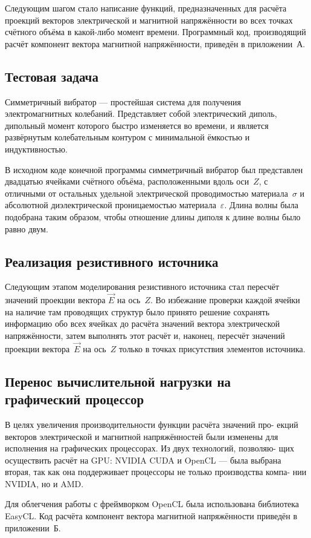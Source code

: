 Следующим шагом стало написание функций, предназначенных для расчёта проекций векторов электрической и магнитной напряжённости во всех точках счётного объёма в какой-либо момент времени. Программный код, производящий расчёт компонент вектора магнитной напряжённости, приведён в приложении~А.

\subsection{Тестовая задача}

Симметричный вибратор --- простейшая система для получения электромагнитных колебаний. Представляет собой электрический диполь, дипольный момент которого быстро изменяется во времени, и является развёрнутым колебательным контуром с минимальной ёмкостью и индуктивностью.

В исходном коде конечной программы симметричный вибратор был представлен двадцатью ячейками счётного объёма, расположенными вдоль оси~$ Z $, с отличными от остальных удельной электрической проводимостью материала~$\sigma$
и абсолютной диэлектрической проницаемостью материала~$\varepsilon$. Длина волны была подобрана таким образом, чтобы отношение длины диполя к длине волны было равно двум.

\subsection{Реализация резистивного источника}

Следующим этапом моделирования резистивного источника стал пересчёт
значений проекции вектора $ \vec{E} $ на ось~$ Z $. Во избежание проверки каждой ячейки на наличие там проводящих структур было принято решение сохранять информацию обо всех ячейках до расчёта значений вектора электрической напряжённости, затем выполнять этот расчёт и, наконец, пересчёт значений проекции
вектора~$ \vec{E} $ на ось~$ Z $ только в точках присутствия элементов источника.

\subsection{Перенос вычислительной нагрузки на графический процессор}

В целях увеличения производительности функции расчёта значений про-
екций векторов электрической и магнитной напряжённостей были изменены
для исполнения на графических процессорах. Из двух технологий, позволяю-
щих осуществить расчёт на GPU: NVIDIA CUDA и OpenCL --- была выбрана
вторая, так как она поддерживает процессоры не только производства компа-
нии NVIDIA, но и AMD.

Для облегчения работы с фреймворком OpenCL была использована библиотека EasyCL. Код расчёта компонент вектора магнитной напряжённости
приведён в приложении~Б.

\clearpage